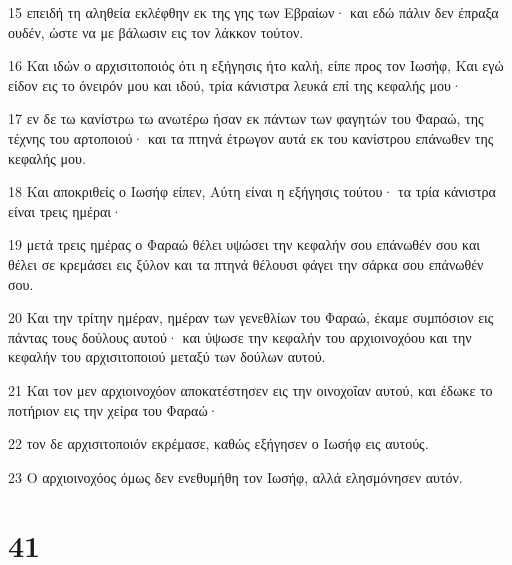 \par 15 επειδή τη αληθεία εκλέφθην εκ της γης των Εβραίων· και εδώ πάλιν δεν έπραξα ουδέν, ώστε να με βάλωσιν εις τον λάκκον τούτον.
\par 16 Και ιδών ο αρχισιτοποιός ότι η εξήγησις ήτο καλή, είπε προς τον Ιωσήφ, Και εγώ είδον εις το όνειρόν μου και ιδού, τρία κάνιστρα λευκά επί της κεφαλής μου·
\par 17 εν δε τω κανίστρω τω ανωτέρω ήσαν εκ πάντων των φαγητών του Φαραώ, της τέχνης του αρτοποιού· και τα πτηνά έτρωγον αυτά εκ του κανίστρου επάνωθεν της κεφαλής μου.
\par 18 Και αποκριθείς ο Ιωσήφ είπεν, Αύτη είναι η εξήγησις τούτου· τα τρία κάνιστρα είναι τρεις ημέραι·
\par 19 μετά τρεις ημέρας ο Φαραώ θέλει υψώσει την κεφαλήν σου επάνωθέν σου και θέλει σε κρεμάσει εις ξύλον και τα πτηνά θέλουσι φάγει την σάρκα σου επάνωθέν σου.
\par 20 Και την τρίτην ημέραν, ημέραν των γενεθλίων του Φαραώ, έκαμε συμπόσιον εις πάντας τους δούλους αυτού· και ύψωσε την κεφαλήν του αρχιοινοχόου και την κεφαλήν του αρχισιτοποιού μεταξύ των δούλων αυτού.
\par 21 Και τον μεν αρχιοινοχόον αποκατέστησεν εις την οινοχοΐαν αυτού, και έδωκε το ποτήριον εις την χείρα του Φαραώ·
\par 22 τον δε αρχισιτοποιόν εκρέμασε, καθώς εξήγησεν ο Ιωσήφ εις αυτούς.
\par 23 Ο αρχιοινοχόος όμως δεν ενεθυμήθη τον Ιωσήφ, αλλά ελησμόνησεν αυτόν.

\chapter{41}

